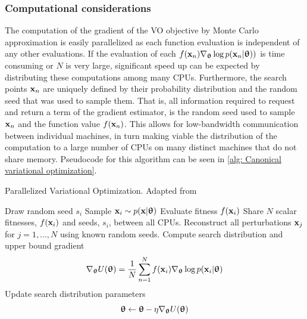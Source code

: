 \subsubsection{Computational considerations}
The computation of the gradient of the \gls{VO} objective by Monte Carlo approximation is easily parallelized as each function evaluation is independent of any other evaluations. If the evaluation of each $f({\mathbf{x}}_n)\nabla_{{\boldsymbol{\uptheta}}} \log p({\mathbf{x}}_n|{{\boldsymbol{\uptheta}}}))$ is time consuming or $N$ is very large, significant speed up can be expected by distributing these computations among many \glspl{CPU}. Furthermore, the search points ${\mathbf{x}}_n$ are uniquely defined by their probability distribution and the random seed that was used to sample them. That is, all information required to request and return a term of the gradient estimator, is the random seed used to sample ${\mathbf{x}}_n$ and the function value $f({\mathbf{x}}_n)$. This allows for low-bandwidth communication between individual machines, in turn making viable the distribution of the computation to a large number of \glspl{CPU} on many distinct machines that do not share memory. Pseudocode for this algorithm can be seen in \autoref{alg: Canonical variational optimization}. 

\begin{algorithm}[tbp!]
	\caption{Parallelized Variational Optimization. Adapted from \cite{Wierstra2008} \label{alg: Canonical variational optimization}}
	\begin{algorithmic}[1]
		\Repeat
			 
			    \State Draw random seed $s_i$
				\State Sample ${\mathbf{x}}_i\sim p({\mathbf{x}}|{\boldsymbol{\uptheta}})$
				\State Evaluate fitness $f({\mathbf{x}}_i)$
			\EndFor
			\State Share $N$ scalar fitnesses, $f({\mathbf{x}}_i)$ and seeds, $s_i$, between all \glspl{CPU}.
			 
				\State Reconstruct all perturbations ${\mathbf{x}}_j$ for $j=1,\dots,N$ using known random seeds.
				\State Compute search distribution and upper bound gradient
				$$\nabla_{\boldsymbol{\uptheta}} U({\boldsymbol{\uptheta}}) = \frac{1}{N}\sum_{n=1}^N f({\mathbf{x}}_i) \nabla_{\boldsymbol{\uptheta}}\log p({\mathbf{x}}_i|{\boldsymbol{\uptheta}})$$
				\State Update search distribution parameters 
				$${\boldsymbol{\uptheta}} \gets {\boldsymbol{\uptheta}} - \eta\nabla_{\boldsymbol{\uptheta}} U({\boldsymbol{\uptheta}})$$
			\EndFor
	\end{algorithmic}
\end{algorithm}


